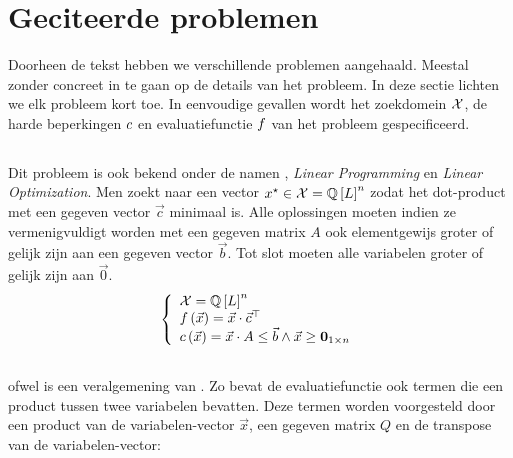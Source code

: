 \section{Geciteerde problemen}

Doorheen de tekst hebben we verschillende problemen aangehaald. Meestal zonder concreet in te gaan op de details van het probleem. In deze sectie lichten we elk probleem kort toe. In eenvoudige gevallen wordt het zoekdomein $\ConfigSet$, de harde beperkingen $\hcfun$ en evaluatiefunctie $\evalfun$ van het probleem gespecificeerd.

\subsection{}

Dit probleem is ook bekend onder de namen , \emph{Linear Programming} en \emph{Linear Optimization}. Men zoekt naar een vector $\xstar\in\ConfigSet=\QbitSet{\bitvar}^n$ zodat het dot-product met een gegeven vector $\vec{c}$ minimaal is. Alle oplossingen moeten indien ze vermenigvuldigt worden met een gegeven matrix $A$ ook elementgewijs groter of gelijk zijn aan een gegeven vector $\vec{b}$. Tot slot moeten alle variabelen groter of gelijk zijn aan $\vec{0}$.
\begin{equation}
\guards{
\ConfigSet=\QbitSet{\bitvar}^n\\
\fun{\evalfun}{\vec{x}}=\vec{x}\cdot\transpose{\vec{c}}\\
\fun{\hcfun}{\vec{x}}=\vec{x}\cdot A\leq\vec{b}\wedge\vec{x}\geq\zeromatrix[1\times n]
}
\end{equation}

\subsection{}

 ofwel  is een veralgemening van . Zo bevat de evaluatiefunctie ook termen die een product tussen twee variabelen bevatten. Deze termen worden voorgesteld door een product van de variabelen-vector $\vec{x}$, een gegeven matrix $Q$ en de transpose van de variabelen-vector:


